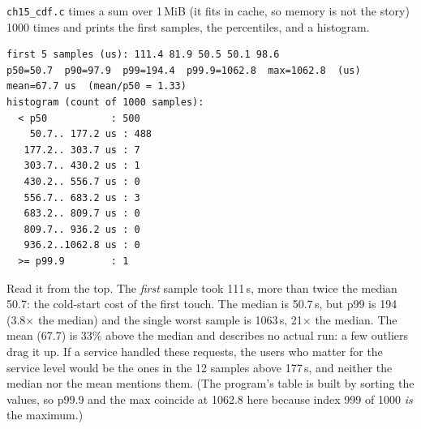 \begin{example}
\texttt{ch15\_cdf.c} times a sum over 1\,MiB (it fits in cache, so
memory is not the story) 1000 times and prints the first samples, the
percentiles, and a histogram.

\begin{lstlisting}[basicstyle=\ttfamily\scriptsize,caption={Real output of
\texttt{ch15\_cdf} (Linux container).}]
first 5 samples (us): 111.4 81.9 50.5 50.1 98.6
p50=50.7  p90=97.9  p99=194.4  p99.9=1062.8  max=1062.8  (us)
mean=67.7 us  (mean/p50 = 1.33)
histogram (count of 1000 samples):
  < p50           : 500
    50.7.. 177.2 us : 488
   177.2.. 303.7 us : 7
   303.7.. 430.2 us : 1
   430.2.. 556.7 us : 0
   556.7.. 683.2 us : 3
   683.2.. 809.7 us : 0
   809.7.. 936.2 us : 0
   936.2..1062.8 us : 0
  >= p99.9        : 1
\end{lstlisting}

Read it from the top. The \emph{first} sample took 111\,\textmu s, more
than twice the median 50.7: the cold-start cost of the first touch.
The median is 50.7\,\textmu s, but p99 is 194 (3.8$\times$ the median)
and the single worst sample is 1063\,\textmu s, 21$\times$ the median.
The mean (67.7) is 33\% above the median and describes no actual run:
a few outliers drag it up. If a service handled these requests, the
users who matter for the service level would be the ones in the
12 samples above 177\,\textmu s, and neither the median nor the mean
mentions them. (The program's table is built by sorting the values,
so p99.9 and the max coincide at 1062.8 here because index 999 of 1000
\emph{is} the maximum.)
\end{example}

